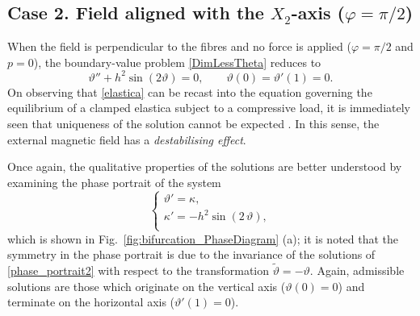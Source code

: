 \documentclass[oneside]{article}
\begin{document}
			\subsection*{Case 2. Field aligned with the $X_2$-axis ($\varphi=\pi/2$)}
			
			When the field is perpendicular to the fibres and no force is applied ($\varphi=\pi/2$ and $p=0$), the boundary-value problem \eqref{DimLessTheta} reduces to
			\begin{equation}
			\vartheta''+h^2 \sin(2\vartheta)=0, \qquad \vartheta(0)=\vartheta'(1)=0.
			\label{elastica}
			\end{equation}
			On observing that \eqref{elastica} can be recast into the equation governing the equilibrium of a clamped elastica subject to a compressive load, it is immediately seen that uniqueness of the solution cannot be expected \cite{cevoli}. In this sense, the external magnetic field has a \emph{destabilising effect}. 
			
			Once again, the qualitative properties of the solutions are better understood by examining the phase portrait of the system
			\begin{equation}\label{phase_portrait2}
			\begin{cases}
			\vartheta'=\kappa,\\
			\kappa'=-h^2\sin(2\,\vartheta),\\
			\end{cases}
			\end{equation}
			which is shown in Fig.~\ref{fig:bifurcation_PhaseDiagram} (a); it is noted that the symmetry in the phase portrait is due to the invariance of the solutions of \eqref{phase_portrait2} with respect to the transformation $\tilde\vartheta=-\vartheta$. Again, admissible solutions are those which originate on the vertical axis ($\vartheta(0)=0$) and terminate on the horizontal axis ($\vartheta'(1)=0$). 
			
\end{document}

